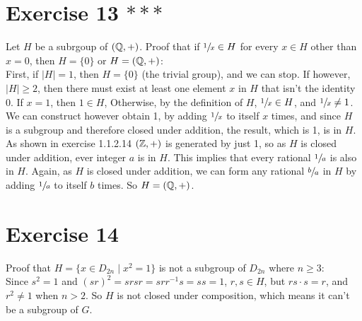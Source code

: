\documentclass[12pt]{article}
\begin{document}
    \section*{Exercise 13 $***$}
    Let $H$ be a subrgoup of $(\mathbb{Q}, +)$.
    Proof that if $\sfrac{1}{x} \in H$ for every $x \in H$ other than $x = 0$,
    then $H = \{0\}$ or $H = (\mathbb{Q}, +)$: \\
    First, if $|H| = 1$, then $H = \{0\}$ (the trivial group),
    and we can stop.
    If however, $|H| \geqslant 2$,
    then there must exist at least one element $x$ in $H$ that isn't the
    identity 0.
    If $x = 1$, then $1 \in H$,
    Otherwise, by the definition of $H$, $\sfrac{1}{x} \in H$,
    and $\sfrac{1}{x} \neq 1$.
    We can construct however obtain 1,
    by adding $\sfrac{1}{x}$ to itself $x$ times,
    and since $H$ is a subgroup and therefore closed under addition,
    the result, which is 1, is in $H$.
    As shown in exercise 1.1.2.14 $(\mathbb{Z}, +)$ is generated by just 1,
    so as $H$ is closed under addition,
    ever integer $a$ is in $H$.
    This implies that every rational $\sfrac{1}{a}$ is also in $H$.
    Again, as $H$ is closed under addition,
    we can form any rational $\sfrac{b}{a}$ in $H$
    by adding $\sfrac{1}{a}$ to itself $b$ times.
    So $H = (\mathbb{Q}, +)$.


    \section*{Exercise 14}
    Proof that $H = \{x \in D_{2n} \mid x^2 = 1\}$
    is not a subgroup of $D_{2n}$ where $n \geqslant 3$: \\
    Since $s^2 = 1$ and $(sr)^2 = srsr = srr^{-1}s = ss = 1$,
    $r, s \in H$,
    but $rs \cdot s = r$, and $r^2 \neq 1$ when $n > 2$.
    So $H$ is not closed under composition,
    which means it can't be a subgroup of $G$.
\end{document}
